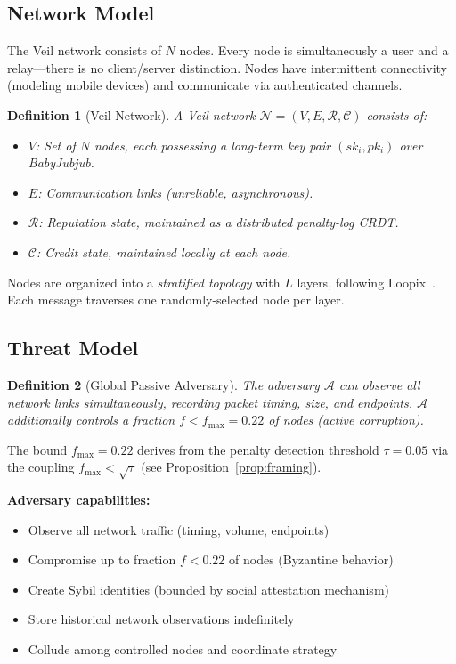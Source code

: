 \documentclass[11pt,a4paper]{article}
\newtheorem{definition}{Definition}
\newcommand{\Adv}{\mathcal{A}}
\newcommand{\Net}{\mathcal{N}}
\begin{document}
\subsection{Network Model}

The Veil network consists of $N$ nodes. Every node is simultaneously a user and a relay---there is no client/server distinction. Nodes have intermittent connectivity (modeling mobile devices) and communicate via authenticated channels.

\begin{definition}[Veil Network]
A Veil network $\Net = (V, E, \mathcal{R}, \mathcal{C})$ consists of:
\begin{itemize}[nosep]
    \item $V$: Set of $N$ nodes, each possessing a long-term key pair $(sk_i, pk_i)$ over BabyJubjub.
    \item $E$: Communication links (unreliable, asynchronous).
    \item $\mathcal{R}$: Reputation state, maintained as a distributed penalty-log CRDT.
    \item $\mathcal{C}$: Credit state, maintained locally at each node.
\end{itemize}
\end{definition}

Nodes are organized into a \emph{stratified topology} with $L$ layers, following Loopix~\cite{loopix}. Each message traverses one randomly-selected node per layer.

\subsection{Threat Model}

\begin{definition}[Global Passive Adversary]
The adversary $\Adv$ can observe all network links simultaneously, recording packet timing, size, and endpoints. $\Adv$ additionally controls a fraction $f < f_{\max} = 0.22$ of nodes (active corruption).
\end{definition}

The bound $f_{\max} = 0.22$ derives from the penalty detection threshold $\tau = 0.05$ via the coupling $f_{\max} < \sqrt{\tau}$ (see Proposition~\ref{prop:framing}).

\textbf{Adversary capabilities:}
\begin{itemize}[nosep]
    \item Observe all network traffic (timing, volume, endpoints)
    \item Compromise up to fraction $f < 0.22$ of nodes (Byzantine behavior)
    \item Create Sybil identities (bounded by social attestation mechanism)
    \item Store historical network observations indefinitely
    \item Collude among controlled nodes and coordinate strategy
\end{itemize}
\end{document}
